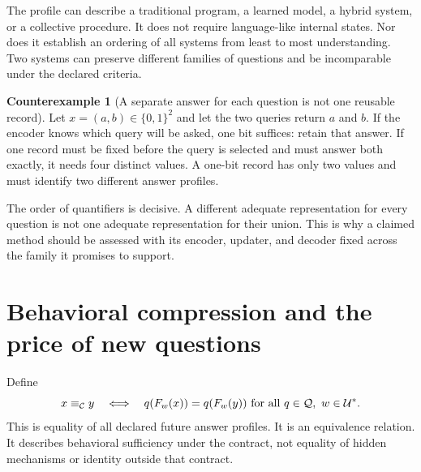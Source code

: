 \documentclass[11pt,letterpaper]{article}
\theoremstyle{plain}
\theoremstyle{definition}
\newtheorem{counterexample}[theorem]{Counterexample}
\newcommand{\U}{\mathcal U}\newcommand{\Q}{\mathcal Q}
\newcommand{\Eq}{\equiv_{\C}}\newcommand{\supp}{\operatorname{supp}}
\begin{document}
The profile can describe a traditional program, a learned model, a hybrid system, or a collective procedure. It does not require language-like internal states. Nor does it establish an ordering of all systems from least to most understanding. Two systems can preserve different families of questions and be incomparable under the declared criteria.

\begin{counterexample}[A separate answer for each question is not one reusable record]\label{ex:joint}
Let $x=(a,b)\in\{0,1\}^2$ and let the two queries return $a$ and $b$. If the encoder knows which query will be asked, one bit suffices: retain that answer. If one record must be fixed before the query is selected and must answer both exactly, it needs four distinct values. A one-bit record has only two values and must identify two different answer profiles.
\end{counterexample}
The order of quantifiers is decisive. A different adequate representation for every question is not one adequate representation for their union. This is why a claimed method should be assessed with its encoder, updater, and decoder fixed across the family it promises to support.

\section{Behavioral compression and the price of new questions}\label{sec:quotients}
Define
\begin{equation}\label{eq:equivalence}
x\Eq y\quad\Longleftrightarrow\quad q(F_w(x))=q(F_w(y))\ \text{for all }q\in\Q,\ w\in\U^*.
\end{equation}
This is equality of all declared future answer profiles. It is an equivalence relation. It describes behavioral sufficiency under the contract, not equality of hidden mechanisms or identity outside that contract.
\end{document}
